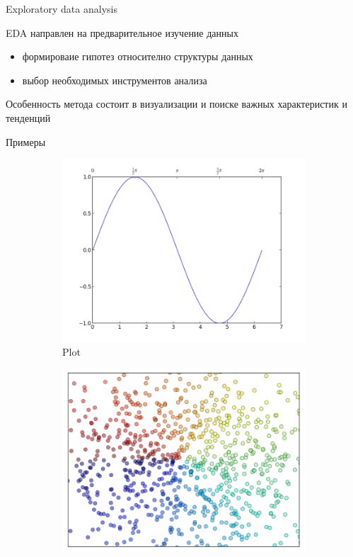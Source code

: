 \documentclass[10pt]{beamer}
\begin{document}
\begin{frame}{Exploratory data analysis}

EDA направлен на предварительное изучение данных
\begin{itemize}
\item формироваие гипотез относително структуры данных
\item выбор необходимых инструментов анализа
\end{itemize}
Особенность метода состоит в визуализации и поиске важных характеристик и тенденций

\end{frame}

\begin{frame}{Примеры}

\begin{figure}
        \centering
        \begin{subfigure}[b]{0.3\textwidth}
                \includegraphics[width=\textwidth]{images/plot.png}
                \caption{Plot}                
        \end{subfigure}%
        \begin{subfigure}[b]{0.3\textwidth}
                \includegraphics[width=\textwidth]{images/scatter.png}

\end{subfigure}
\end{figure}
\end{frame}
\end{document}
